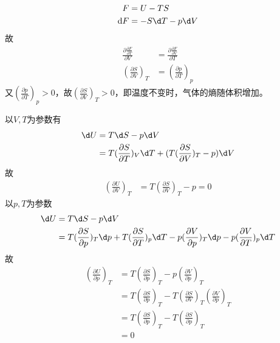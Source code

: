 \documentclass{phyasgn}
\begin{document}
\begin{sol}[1]
    \begin{align*}
        F&=U-TS\\
        \mathrm{d} F&=-S\d T-p\d V\\
    \end{align*}
    故
    \begin{align*}
        \frac{\partial\frac{\partial F}{\partial T}}{\partial V}&=\frac{\partial\frac{\partial F}{\partial V}}{\partial T}\\
        (\frac{\partial S}{\partial V})_T&=(\frac{\partial p}{\partial T})_p
    \end{align*}
    又$(\frac{\partial p}{\partial T})_p>0$，故$(\frac{\partial S}{\partial V})_T>0$，即温度不变时，气体的熵随体积增加。
\end{sol}\par

\begin{sol}[2]
    以$V,T$为参数有
    \begin{align*}
        \d U&=T\d S-p\d V\\
        &=T(\frac{\partial S}{\partial T})_V\d T+(T(\frac{\partial S}{\partial V})_T-p)\d V
    \end{align*}
    故
    \begin{align*}
        (\frac{\partial U}{\partial V})_T&=T(\frac{\partial S}{\partial V})_T-p=0
    \end{align*}
    以$p,T$为参数
    \begin{align*}
        \d U&=T\d S-p\d V\\
        &=T(\frac{\partial S}{\partial p})_T\d p+T(\frac{\partial S}{\partial T})_p\d T-p(\frac{\partial V}{\partial p})_T\d p-p(\frac{\partial V}{\partial T})_p\d T
    \end{align*}
    故
    \begin{align*}
        (\frac{\partial U}{\partial p})_T&=T(\frac{\partial S}{\partial p})_T-p(\frac{\partial V}{\partial p})_T\\
        &=T(\frac{\partial S}{\partial p})_T-T(\frac{\partial S}{\partial V})_T(\frac{\partial V}{\partial p})_T\\
        &=T(\frac{\partial S}{\partial p})_T-T(\frac{\partial S}{\partial p})_T\\
        &=0
    \end{align*}
\end{sol}\par
\end{document}
